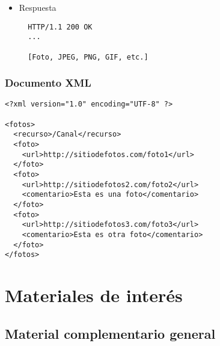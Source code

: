 {\begin{itemize}
\item Respuesta

\begin{verbatim}
  HTTP/1.1 200 OK
  ...

  [Foto, JPEG, PNG, GIF, etc.]
\end{verbatim}

\end{itemize}


\subsubsection*{Documento XML}


\begin{verbatim}
<?xml version="1.0" encoding="UTF-8" ?>

<fotos>
  <recurso>/Canal</recurso>
  <foto>
    <url>http://sitiodefotos.com/foto1</url>
  </foto>
  <foto>
    <url>http://sitiodefotos2.com/foto2</url>
    <comentario>Esta es una foto</comentario>
  </foto>
  <foto>
    <url>http://sitiodefotos3.com/foto3</url>
    <comentario>Esta es otra foto</comentario>
  </foto>
</fotos>
\end{verbatim}

\newpage



\newpage



\newpage



\newpage



\newpage



\newpage
\section{Materiales de interés}

\subsection{Material complementario general}

}
